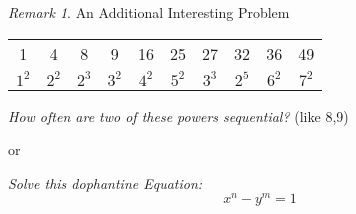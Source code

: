 \documentclass[fleqn,letterpaper,10pt,twoside]{report}
\theoremstyle{plain}
\theoremstyle{definition}
\theoremstyle{remark}
\newtheorem*{remark}{Remark}
\begin{document}
\begin{remark}{An Additional Interesting Problem}

\begin{tabular}{cccccccccc}
   1 & 4 & 8 & 9 & 16 & 25 & 27 & 32 & 36 & 49 \\
   \(1^2\) & \(2^2\) &\(2^3\) & \(3^2\) & \(4^2\) & \(5^2\) &\(3^3\) & \(2^5\) & \(6^2\) & \(7^2\) \\
\end{tabular}

\textit{How often are two of these powers sequential?} (like 8,9)

or

\textit{Solve this dophantine Equation:}
\[x^n-y^m=1\]

\end{remark}
\end{document}
